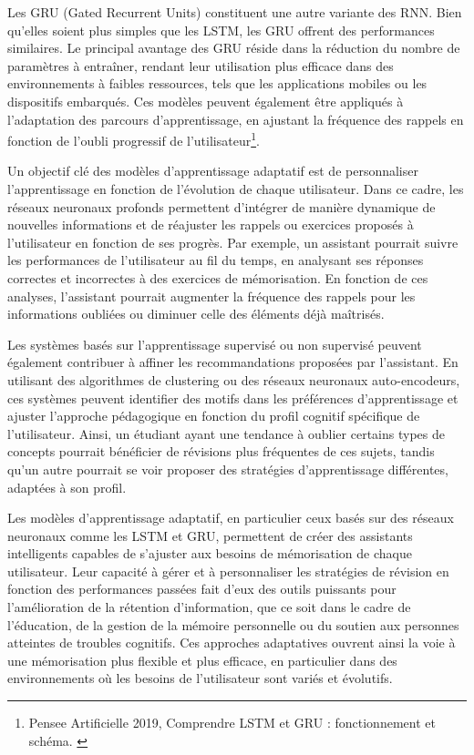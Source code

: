 \documentclass[11pt,a4paper]{report}
\begin{document}
Les GRU (Gated Recurrent Units) constituent une autre variante des RNN. Bien qu'elles soient plus simples que les LSTM, les GRU offrent des performances similaires. Le principal avantage des GRU réside dans la réduction du nombre de paramètres à entraîner, rendant leur utilisation plus efficace dans des environnements à faibles ressources, tels que les applications mobiles ou les dispositifs embarqués. Ces modèles peuvent également être appliqués à l'adaptation des parcours d'apprentissage, en ajustant la fréquence des rappels en fonction de l’oubli progressif de l’utilisateur\footnote{Pensee Artificielle 2019, Comprendre LSTM et GRU : fonctionnement et schéma. \cite{penseeartificielle}}.

Un objectif clé des modèles d’apprentissage adaptatif est de personnaliser l’apprentissage en fonction de l’évolution de chaque utilisateur. Dans ce cadre, les réseaux neuronaux profonds permettent d'intégrer de manière dynamique de nouvelles informations et de réajuster les rappels ou exercices proposés à l'utilisateur en fonction de ses progrès. Par exemple, un assistant pourrait suivre les performances de l'utilisateur au fil du temps, en analysant ses réponses correctes et incorrectes à des exercices de mémorisation. En fonction de ces analyses, l’assistant pourrait augmenter la fréquence des rappels pour les informations oubliées ou diminuer celle des éléments déjà maîtrisés.

Les systèmes basés sur l’apprentissage supervisé ou non supervisé peuvent également contribuer à affiner les recommandations proposées par l’assistant. En utilisant des algorithmes de clustering ou des réseaux neuronaux auto-encodeurs, ces systèmes peuvent identifier des motifs dans les préférences d’apprentissage et ajuster l’approche pédagogique en fonction du profil cognitif spécifique de l’utilisateur. Ainsi, un étudiant ayant une tendance à oublier certains types de concepts pourrait bénéficier de révisions plus fréquentes de ces sujets, tandis qu’un autre pourrait se voir proposer des stratégies d'apprentissage différentes, adaptées à son profil.

Les modèles d’apprentissage adaptatif, en particulier ceux basés sur des réseaux neuronaux comme les LSTM et GRU, permettent de créer des assistants intelligents capables de s’ajuster aux besoins de mémorisation de chaque utilisateur. Leur capacité à gérer et à personnaliser les stratégies de révision en fonction des performances passées fait d’eux des outils puissants pour l’amélioration de la rétention d’information, que ce soit dans le cadre de l’éducation, de la gestion de la mémoire personnelle ou du soutien aux personnes atteintes de troubles cognitifs. Ces approches adaptatives ouvrent ainsi la voie à une mémorisation plus flexible et plus efficace, en particulier dans des environnements où les besoins de l’utilisateur sont variés et évolutifs.
\end{document}

